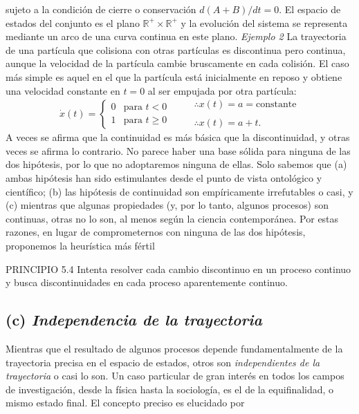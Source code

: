 \begin{justifying}
    \noindent sujeto a la condición de cierre o conservación $d(A+B)/dt=0$. El espacio de estados del conjunto es el plano $\mathbb{R}^+ \times \mathbb{R}^+$ y la evolución del sistema se representa mediante un arco de una curva continua en este plano. \textit{Ejemplo 2} La trayectoria de una partícula que colisiona con otras partículas es 
    discontinua pero continua, aunque la velocidad de la partícula cambie bruscamente en cada colisión. El caso más simple es aquel en el que la partícula está inicialmente en reposo y obtiene una velocidad constante en $t=0$ al ser empujada por otra partícula:
    \[
        \dot{x}(t) = 
        \begin{cases} 
        0 & \text{para } t < 0 \\
        1 & \text{para } t \ge 0 
        \end{cases}
        \qquad
        \begin{array}{l}
        \therefore x(t) = a = \text{constante} \\
        \\
        \therefore x(t) = a + t.
        \end{array}
    \]
    A veces se afirma que la continuidad es más básica que la discontinuidad, y otras veces se afirma lo contrario. No parece haber una base sólida para ninguna de las dos hipótesis, por lo que no adoptaremos ninguna de ellas. Solo sabemos que (a) ambas hipótesis han sido estimulantes desde el punto de vista ontológico y científico; (b) las hipótesis de continuidad son empíricamente irrefutables o casi, y (c) mientras que algunas propiedades (y, por lo tanto, algunos procesos) son continuas, otras no lo son, al menos según la ciencia contemporánea. Por estas razones, en lugar de comprometernos con ninguna de las dos hipótesis, proponemos la heurística más fértil

    \medskip
    \noindent PRINCIPIO 5.4 Intenta resolver cada cambio discontinuo en un proceso continuo y busca discontinuidades en cada proceso aparentemente continuo.

  \bigskip

    \subsection*{(c)\textit{ Independencia de la trayectoria}}
    \noindent Mientras que el resultado de algunos procesos depende fundamentalmente de la
    trayectoria precisa en el espacio de estados, otros son {\textit{independientes de la trayectoria}} o casi
    lo son. Un caso particular de gran interés en todos los campos de investigación, desde la física
    hasta la sociología, es el de la equifinalidad, o mismo estado final. El concepto preciso
    es elucidado por


\end{justifying}
